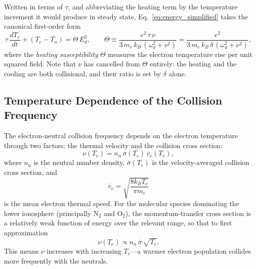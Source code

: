 \documentclass[12pt]{article}
\begin{document}
Written in terms of $\tau$, and abbreviating the heating term by the temperature increment
it would produce in steady state, Eq.~\eqref{eq:energy_simplified} takes the canonical
first-order form
\begin{equation}
  \tau\,\frac{dT_e}{dt} + (T_e - T_n) = \Theta\,E_d^2,
  \qquad
  \Theta \equiv \frac{e^2\,\tau\,\nu}{3\,m_e\,k_B\,(\omega_d^2+\nu^2)}
        = \frac{e^2}{3\,m_e\,k_B\,\delta\,(\omega_d^2+\nu^2)},
  \label{eq:energy_canonical}
\end{equation}
where the \emph{heating susceptibility} $\Theta$ measures the electron temperature rise per
unit squared field.  Note that $\nu$ has cancelled from $\Theta$ entirely: the heating and
the cooling are both collisional, and their ratio is set by $\delta$ alone.

\subsection{Temperature Dependence of the Collision Frequency}
\label{sec:nu_T}

The electron-neutral collision frequency depends on the electron temperature through two
factors: the thermal velocity and the collision cross section:
\begin{equation}
  \nu(T_e) = n_n\,\overline{\sigma}(T_e)\,\bar{v}_e(T_e),
  \label{eq:nu_general}
\end{equation}
where $n_n$ is the neutral number density, $\overline{\sigma}(T_e)$ is the
velocity-averaged collision cross section, and
\begin{equation}
  \bar{v}_e = \sqrt{\frac{8k_BT_e}{\pi m_e}}
  \label{eq:ve}
\end{equation}
is the mean electron thermal speed.  For the molecular species dominating the lower
ionosphere (principally N$_2$ and O$_2$), the momentum-transfer cross section is a
relatively weak function of energy over the relevant range, so that to first approximation
\begin{equation}
  \nu(T_e) \propto n_n\,\overline{\sigma}\,\sqrt{T_e}.
  \label{eq:nu_approx}
\end{equation}
This means $\nu$ increases with increasing $T_e$---a warmer electron population collides
more frequently with the neutrals.
\end{document}
